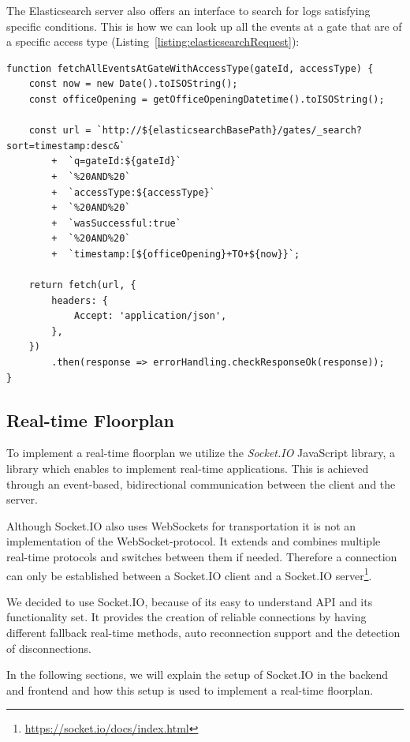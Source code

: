 The Elasticsearch server also offers an interface to search for logs satisfying specific conditions. This is how we can look up all the events at a gate that are of a specific access type (Listing~\ref{listing:elasticsearchRequest}):

\clearpage

\begin{lstlisting}[label={listing:elasticsearchRequest},caption={Example search request to Elasticsearch server}]
function fetchAllEventsAtGateWithAccessType(gateId, accessType) {
    const now = new Date().toISOString();
    const officeOpening = getOfficeOpeningDatetime().toISOString();

    const url = `http://${elasticsearchBasePath}/gates/_search?sort=timestamp:desc&`
        +  `q=gateId:${gateId}`
        +  `%20AND%20`
        +  `accessType:${accessType}`
        +  `%20AND%20`
        +  `wasSuccessful:true`
        +  `%20AND%20`
        +  `timestamp:[${officeOpening}+TO+${now}}`;
        
    return fetch(url, {
        headers: {
            Accept: 'application/json',
        },
    })
        .then(response => errorHandling.checkResponseOk(response));
}
\end{lstlisting}

\subsection{Real-time Floorplan}
\label{Real-time Floorplan}

To implement a real-time floorplan we utilize the \emph{Socket.IO} JavaScript library, a library which enables to implement real-time applications. This is achieved through an event-based, bidirectional communication between the client and the server. 

Although Socket.IO also uses WebSockets for transportation it is not an implementation of the WebSocket-protocol. It extends and combines multiple real-time protocols and switches between them if needed. Therefore a connection can only be established between a Socket.IO client and a Socket.IO server\footnote{\url{https://socket.io/docs/index.html}}.

We decided to use Socket.IO, because of its easy to understand API and its functionality set. It provides the creation of reliable connections by having different fallback real-time methods, auto reconnection support and the detection of disconnections.

In the following sections, we will explain the setup of Socket.IO in the backend and frontend and how this setup is used to implement a real-time floorplan.


